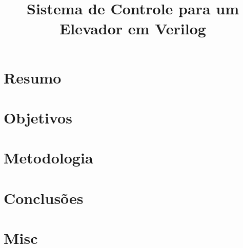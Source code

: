 \documentclass[12pt, twoside]{report}
\title{Sistema de Controle para um Elevador em Verilog}
\begin{document}


\chapter*{Resumo}


\tableofcontents

\chapter{Objetivos}




\chapter{Metodologia}


\chapter{Conclusões}


\appendix
\chapter{Misc}
\end{document}

